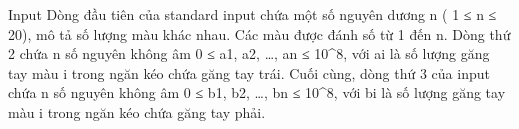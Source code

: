 Input  
Dòng đầu tiên của standard input chứa một số nguyên dương n ( 1 ≤ n ≤ 20), mô tả số lượng màu khác nhau. Các màu được đánh số từ 1 đến n. Dòng thứ 2 chứa n số nguyên không âm 0 ≤ a1, a2, …, an ≤ 10^8, với ai là số lượng găng tay màu i trong ngăn kéo chứa găng tay trái. Cuối cùng, dòng thứ 3 của input chứa n số nguyên không âm 0 ≤ b1, b2, …, bn ≤ 10^8, với bi là số lượng găng tay màu i trong ngăn kéo chứa găng tay phải.
